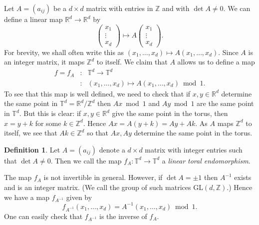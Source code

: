 \documentclass[12pt]{article}
\theoremstyle{definition}
\newtheorem{definition}[theorem]{Definition}
\theoremstyle{remark}
\begin{document}


Let $A = (a_{ij})$ be a $d \times d$ matrix with entries in 
$\mathbb Z$ and with $\det A \not= 0$.  We can define a linear
map $\mathbb R^d \rightarrow \mathbb R^d$ by
\[ 
\left(
\begin{array}{c} x_{1} \\ \vdots \\ x_{d} \end{array} \right)
\mapsto 
A \left(
\begin{array}{c} x_{1} \\ \vdots \\ x_{d} \end{array} \right).
\]
For brevity, we shall often write this as $(x_{1}, \ldots, x_{d})
\mapsto A(x_{1}, \ldots, x_{d})$.
Since $A$ is an integer matrix, it maps $\mathbb Z^{d}$ to itself.  We claim
that $A$ allows us to define a map
\begin{eqnarray*} 
 f= f_{A} & : & 
 \mathbb T^d \rightarrow 
 \mathbb T^d \\
           & : & (x_{1}, \ldots, x_{d}) \mapsto A(x_{1}, \ldots, x_{d})
           \bmod 1.
\end{eqnarray*}
To see that this map is well defined, we need to check that if $x,y
\in \mathbb R^{d}$ determine the same point in $\mathbb T^d =\mathbb R^{d}/\mathbb Z^{d}$
then $Ax \bmod 1$ and $Ay \bmod 1$ are the same point in
$\mathbb T^d$.  But this is clear: if $x, y \in \mathbb R^{d}$ give the
same point in the torus, then $x=y+k$ for some $k \in \mathbb Z^{d}$.  Hence
$Ax = A(y+k) = Ay + Ak$.  As $A$ maps $\mathbb Z^{d}$ to itself, we see that
$Ak \in \mathbb Z^{d}$ so that $Ax, Ay$ determine the same point in the
torus.

\begin{definition}
Let $A = (a_{ij})$ denote a $d \times d$ matrix with integer entries such that
$\det A \not=0$.  Then we call the map $f_{A} : \mathbb T^d
\rightarrow \mathbb T^d$ a {\it linear toral endomorphism}.  
\end{definition}

The map $f_A$ is not invertible in general.  However, if $\det A = \pm1$
then $A^{-1}$ exists and is an integer matrix.  (We call the group of such matrices $\mathrm{GL}(d,\mathbb Z)$.)
Hence we have a map
$f_{A^{-1}}$ given by
\[
 f_{A^{-1}}(x_1,\ldots,x_d) = A^{-1}(x_1,\ldots,x_d) \bmod  1.
\]
One can easily check that $f_{A^{-1}}$ is the inverse of $f_A$.
\end{document}
